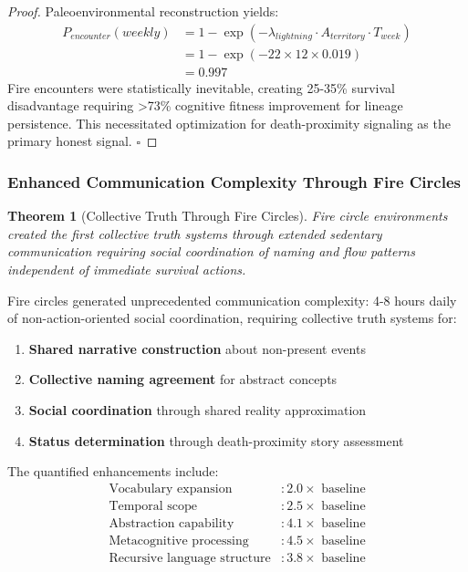 \documentclass[12pt,a4paper]{article}
\newtheorem{theorem}{Theorem}
\begin{document}
\begin{proof}
Paleoenvironmental reconstruction yields:
\begin{align}
P_{encounter}(weekly) &= 1 - \exp(-\lambda_{lightning} \cdot A_{territory} \cdot T_{week}) \\
&= 1 - \exp(-22 \times 12 \times 0.019) \\
&= 0.997
\end{align}
Fire encounters were statistically inevitable, creating 25-35\% survival disadvantage requiring >73\% cognitive fitness improvement for lineage persistence. This necessitated optimization for death-proximity signaling as the primary honest signal. $\square$
\end{proof}

\subsubsection{Enhanced Communication Complexity Through Fire Circles}

\begin{theorem}[Collective Truth Through Fire Circles]
Fire circle environments created the first collective truth systems through extended sedentary communication requiring social coordination of naming and flow patterns independent of immediate survival actions.
\end{theorem}

Fire circles generated unprecedented communication complexity: 4-8 hours daily of non-action-oriented social coordination, requiring collective truth systems for:
\begin{enumerate}
\item \textbf{Shared narrative construction} about non-present events
\item \textbf{Collective naming agreement} for abstract concepts  
\item \textbf{Social coordination} through shared reality approximation
\item \textbf{Status determination} through death-proximity story assessment
\end{enumerate}

The quantified enhancements include:
\begin{align}
\text{Vocabulary expansion} &: 2.0\times \text{ baseline} \\
\text{Temporal scope} &: 2.5\times \text{ baseline} \\
\text{Abstraction capability} &: 4.1\times \text{ baseline} \\
\text{Metacognitive processing} &: 4.5\times \text{ baseline} \\
\text{Recursive language structure} &: 3.8\times \text{ baseline}
\end{align}
\end{document}
